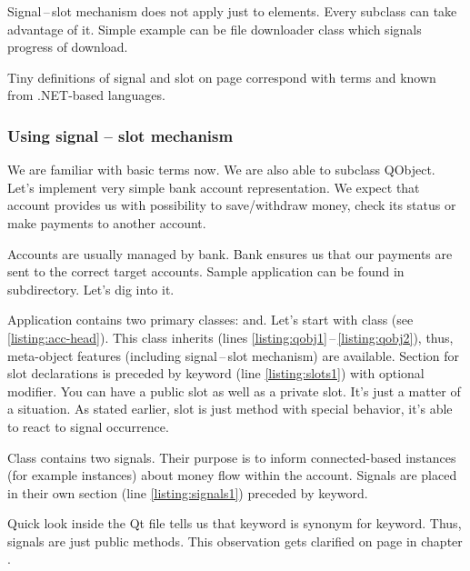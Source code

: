 Signal\,--\,slot mechanism does not apply just to  elements. Every subclass can take advantage of it. Simple example can be file downloader class which signals progress of download.

\begin{fdocextra}
Tiny definitions of signal and slot on page \pageref{desc:sig} correspond with terms  and  known from .NET-based languages. \citep[p.~200-202]{nigel:csharp}
\end{fdocextra}

\subsubsection{Using signal -- slot mechanism}
We are familiar with basic terms now. We are also able to subclass QObject. Let's implement very simple bank account representation. We expect that account provides us with possibility to save/withdraw money, check its status or make payments to another account.

Accounts are usually managed by bank. Bank ensures us that our payments are sent to the correct target accounts. Sample application can be found in subdirectory. Let's dig into it.

Application contains two primary classes: and. Let's start with class (see \autoref{listing:acc-head}). This class inherits (lines \ref{listing:qobj1}\,--\,\ref{listing:qobj2}), thus, meta-object features (including signal\,--\,slot mechanism) are available. Section for slot declarations is preceded by keyword (line \ref{listing:slots1}) with optional modifier. You can have a public slot as well as a private slot. It's just a matter of a situation. As stated earlier, slot is just method with special behavior, it's able to react to signal occurrence.

Class  contains two signals. Their purpose is to inform connected-based instances (for example instances) about money flow within the account. Signals are placed in their own section (line \ref{listing:signals1}) preceded by keyword.

\begin{fdocextra}
Quick look inside the Qt file tells us that keyword is synonym for keyword. Thus, signals are just public methods. This observation gets clarified on page \pageref{section:mocfun} in chapter .
\end{fdocextra}

